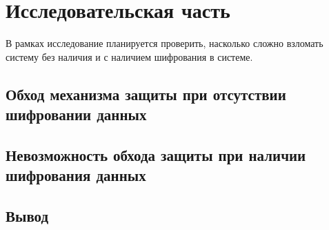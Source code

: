 \section{Исследовательская часть}

В рамках исследование планируется проверить, насколько сложно взломать систему без наличия и с наличием шифрования в системе.

\subsection{Обход механизма защиты при отсутствии шифровании данных}

\subsection{Невозможность обхода защиты при наличии шифрования данных}

\subsection*{Вывод}

\pagebreak